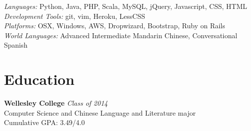 \documentclass[margin,line]{resume}
\begin{document}
\begin{resume}
\textsl{Languages:} Python, Java, PHP, Scala, MySQL, jQuery, Javascript, CSS, HTML\vspace{1mm}\\%
\textsl{Development Tools:} git, vim, Heroku, LessCSS\vspace{1mm}\\%
\textsl{Platforms:} OSX, Windows, AWS, Dropwizard, Bootstrap, Ruby on Rails\vspace{1mm}\\%
\textsl{World Languages:} Advanced Intermediate Mandarin Chinese, Conversational Spanish\vspace{-4mm}\\%
\section{\mysidestyle Education}

\textbf{Wellesley College} \hfill \textsl{Class of 2014}\vspace{0mm}\\%
Computer Science and Chinese Language and Literature major\vspace{0mm}\\%
Cumulative GPA: 3.49/4.0
\end{resume}
\end{document}
